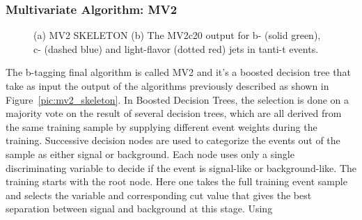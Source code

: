 \subsubsection{Multivariate Algorithm: MV2}
\begin{figure}
\centering
{}
\caption{(a) MV2 SKELETON (b) The MV2c20 output for b- (solid green), c- (dashed blue) and light-flavor (dotted red) jets in tanti-t events.}
\end{figure}
The b-tagging final algorithm is called MV2 and it's a boosted decision tree that take as input the output of the algorithms previously described as shown in Figure~\ref{pic:mv2_skeleton}.
In Boosted Decision Trees, the
selection is done on a majority vote on the result of several decision
trees, which are all derived from the same training sample by
supplying different event weights during the training.
Successive decision nodes are used to categorize the
events out of the sample as either signal or background. Each node
uses only a single discriminating variable to decide if the event is
signal-like or background-like. 
The training starts with the root node. Here one takes the full training event
sample and selects the variable and corresponding cut value that gives
the best separation between signal and background at this stage. Using
